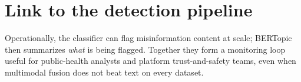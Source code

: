 \section{Link to the detection pipeline}

Operationally, the classifier can flag misinformation content at scale; BERTopic then summarizes \emph{what} is being flagged.
Together they form a monitoring loop useful for public-health analysts and platform trust-and-safety teams, even when multimodal fusion does not beat text on every dataset.
